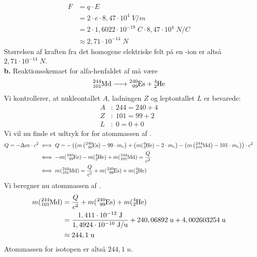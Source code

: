 \documentclass{report}
\begin{document}
\begin{equation*}
\begin{split}
  F&=q \cdot E\\
  &=2 \cdot e \cdot 8,47 \cdot 10^4 \;\unit{V/m} \\
  &=2 \cdot 1,6022 \cdot 10 ^{-19}\;\unit{C} \cdot 8,47 \cdot 10^4 \;\unit{N/C} \\
  &\approx 2,71 \cdot 10 ^{-14} \;\unit{N} 
\end{split}
\end{equation*}
Størrelsen af kraften fra det homogene elektriske felt på en -ion er altså $2,71 \cdot 10 ^{-14} \;\unit{N} $.\\[1ex]
\textbf{b.}
Reaktionsskemaet for alfa-henfaldet af  må være 
\[
\ce{^244_101Md -> ^240_99Es + ^4_2He} 
\] 
Vi kontrollerer, at nukleontallet $A$, ladningen $Z$ og leptontallet $L$ er bevarede:
\begin{equation*}
\begin{split}
  A&: \; 244=240+4\\
  Z&: \; 101=99+2\\
  L&: \; 0=0+0
\end{split}
\end{equation*}
Vi vil nu finde et udtryk for for atommassen af .
\begin{equation*}
\begin{split}
  Q=-\Delta m \cdot c^2 &\iff Q=-\left(\left(m \left(\ce{^240_99Es}\right) -99 \cdot m_e\right) + \left( m(\ce{^4_2He} )-2 \cdot m_e\right)-\left(m \left(\ce{^244_101Md}\right)  -101 \cdot m_e\right) \right) \cdot c^2\\
  &\iff -m (\ce{^240_99Es}) - m(\ce{^4_2He} )+m (\ce{^244_101Md})=\frac{Q}{c^2}\\
  &\iff m (\ce{^244_101Md})=\frac{Q}{c^2}+m (\ce{^240_99Es}) + m(\ce{^4_2He} )
\end{split}
\end{equation*}
Vi beregner nu atommassen af .
\begin{equation*}
\begin{split}
  m (\ce{^244_101Md})&=\frac{Q}{c^2}+m (\ce{^240_99Es}) + m(\ce{^4_2He} )\\
  &=\frac{1,411 \cdot 10 ^{-12} \;\unit{J} }{1,4924 \cdot 10 ^{-10} \;\unit{J/u} } + 240,06892 \;\unit{u} + 4,002603254 \;\unit{u} \\
  &\approx 244,1 \;\unit{u} 
\end{split}
\end{equation*}
Atommassen for isotopen  er altså $244,1 \;\unit{u} $.
\end{document}
